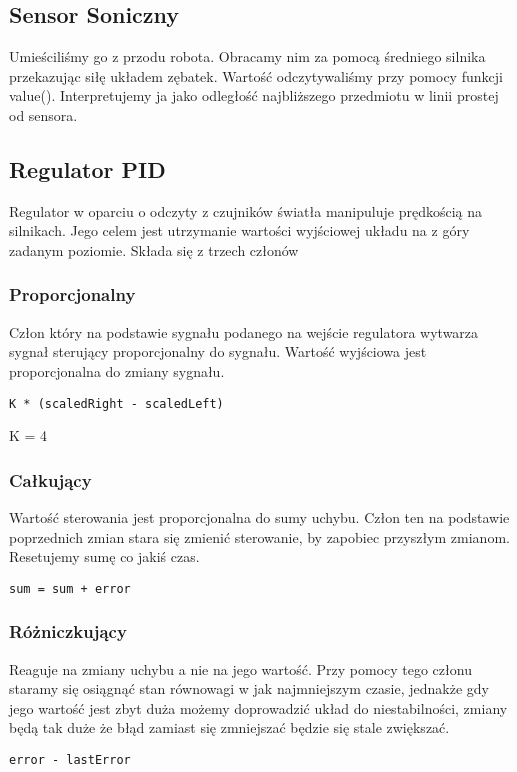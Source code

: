 \documentclass[paper=a4, fontsize=11pt]{scrartcl} %
\numberwithin{equation}{section} %
\numberwithin{figure}{section} %
\numberwithin{table}{section} %
\begin{document}
\subsection{Sensor Soniczny}
Umieściliśmy go z przodu robota. Obracamy nim za pomocą średniego silnika przekazując siłę układem zębatek. Wartość odczytywaliśmy przy pomocy funkcji value(). Interpretujemy ja jako odległość najbliższego przedmiotu w linii prostej od sensora.
\subsection{Regulator PID}
Regulator w oparciu o odczyty z czujników światła manipuluje prędkością na silnikach. Jego celem jest utrzymanie wartości wyjściowej układu na z góry zadanym poziomie.  
Składa się z trzech członów 
\subsubsection{Proporcjonalny}
Człon który na podstawie sygnału podanego na wejście regulatora wytwarza sygnał sterujący proporcjonalny do sygnału. Wartość wyjściowa jest proporcjonalna do zmiany sygnału.  
\begin{lstlisting} 
K * (scaledRight - scaledLeft) 
\end{lstlisting} 
K = 4 
\subsubsection{Całkujący}
Wartość sterowania jest proporcjonalna do sumy uchybu. Człon ten na podstawie poprzednich zmian stara się zmienić sterowanie, by zapobiec przyszłym zmianom. Resetujemy sumę co jakiś czas. 
\begin{lstlisting} 
sum = sum + error
\end{lstlisting}
\subsubsection{Różniczkujący }
Reaguje na zmiany uchybu a nie na jego wartość. Przy pomocy tego członu staramy  się osiągnąć stan równowagi w jak najmniejszym czasie, jednakże gdy jego wartość jest zbyt duża możemy doprowadzić układ do niestabilności, zmiany będą tak duże że błąd zamiast się zmniejszać będzie się  stale zwiększać.  
\begin{lstlisting} 
error - lastError
\end{lstlisting}
\end{document}

